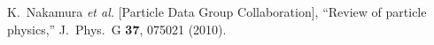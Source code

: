 \documentclass[aps,prc,preprint,superscriptaddress,showpacs,showkeys,amsmath]{revtex4-1}
\begin{document}
\begin{thebibliography}{100}


 
 

  K.~Nakamura {\it et al.}  [Particle Data Group Collaboration],
  ``Review of particle physics,''
  J.\ Phys.\ G {\bf 37}, 075021 (2010).



\end{thebibliography}
\end{document}
